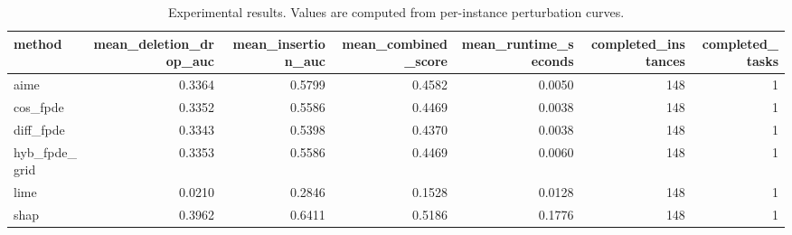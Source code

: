 \begin{table}[t]
\caption{Experimental results. Values are computed from per-instance perturbation curves.}
\label{tab:main_results_computed}
\centering
\begin{tabular}{lrrrrrr}
\toprule
method & mean\_deletion\_drop\_auc & mean\_insertion\_auc & mean\_combined\_score & mean\_runtime\_seconds & completed\_instances & completed\_tasks \\
\midrule
aime & 0.3364 & 0.5799 & 0.4582 & 0.0050 & 148 & 1 \\
cos\_fpde & 0.3352 & 0.5586 & 0.4469 & 0.0038 & 148 & 1 \\
diff\_fpde & 0.3343 & 0.5398 & 0.4370 & 0.0038 & 148 & 1 \\
hyb\_fpde\_grid & 0.3353 & 0.5586 & 0.4469 & 0.0060 & 148 & 1 \\
lime & 0.0210 & 0.2846 & 0.1528 & 0.0128 & 148 & 1 \\
shap & 0.3962 & 0.6411 & 0.5186 & 0.1776 & 148 & 1 \\
\bottomrule
\end{tabular}

\end{table}
